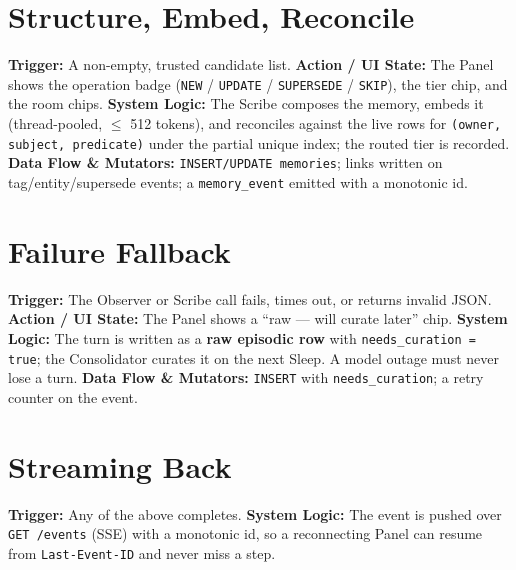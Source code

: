 \section{Structure, Embed, Reconcile}
\textbf{Trigger:} A non-empty, trusted candidate list.
\textbf{Action / UI State:} The Panel shows the operation badge (\texttt{NEW} / \texttt{UPDATE} /
\texttt{SUPERSEDE} / \texttt{SKIP}), the tier chip, and the room chips.
\textbf{System Logic:} The Scribe composes the memory, embeds it (thread-pooled, $\leq$ 512 tokens),
and reconciles against the live rows for \texttt{(owner, subject, predicate)} under the partial unique
index; the routed tier is recorded.
\textbf{Data Flow \& Mutators:} \texttt{INSERT/UPDATE memories}; links written on tag/entity/supersede
events; a \texttt{memory\_event} emitted with a monotonic id.

\section{Failure Fallback}
\textbf{Trigger:} The Observer or Scribe call fails, times out, or returns invalid JSON.
\textbf{Action / UI State:} The Panel shows a ``raw --- will curate later'' chip.
\textbf{System Logic:} The turn is written as a \textbf{raw episodic row} with
\texttt{needs\_curation = true}; the Consolidator curates it on the next Sleep. A model outage must
never lose a turn.
\textbf{Data Flow \& Mutators:} \texttt{INSERT} with \texttt{needs\_curation}; a retry counter on the
event.

\section{Streaming Back}
\textbf{Trigger:} Any of the above completes.
\textbf{System Logic:} The event is pushed over \texttt{GET /events} (SSE) with a monotonic id, so a
reconnecting Panel can resume from \texttt{Last-Event-ID} and never miss a step.
